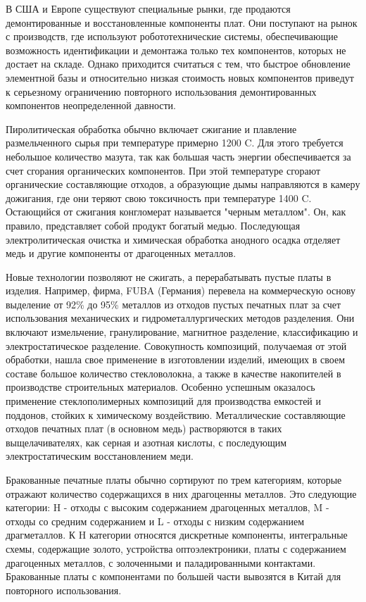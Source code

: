 В США и Европе существуют специальные рынки, где продаются демонтированные и восстановленные компоненты плат. Они поступают на рынок с производств, где используют робототехнические системы, обеспечивающие возможность идентификации и демонтажа только тех компонентов, которых не достает на складе. Однако приходится считаться с тем, что быстрое обновление элементной базы и относительно низкая стоимость новых компонентов приведут к серьезному ограничению повторного использования демонтированных компонентов неопределенной давности.

Пиролитическая обработка обычно включает сжигание и плавление размельченного сырья при температуре примерно 1200 \textdegree C. Для этого требуется небольшое количество мазута, так как большая часть энергии обеспечивается за счет сгорания органических компонентов. При этой температуре сгорают органические составляющие отходов, а образующие дымы направляются в камеру дожигания, где они теряют свою токсичность при температуре 1400 \textdegree C. Остающийся от сжигания конгломерат называется "черным металлом". Он, как правило, представляет собой продукт богатый медью. Последующая электролитическая очистка и химическая обработка анодного осадка отделяет медь и другие компоненты от драгоценных металлов.

Новые технологии позволяют не сжигать, а перерабатывать пустые платы в изделия. Например, фирма, FUBA (Германия) перевела на коммерческую основу выделение от 92\% до 95\% металлов из отходов пустых печатных плат за счет использования механических и гидрометаллургических методов разделения. Они включают измельчение, гранулирование, магнитное разделение, классификацию и электростатическое разделение. Совокупность композиций, получаемая от этой обработки, нашла свое применение в изготовлении изделий, имеющих в своем составе большое количество стекловолокна, а также в качестве накопителей в производстве строительных материалов. Особенно успешным оказалось применение стеклополимерных композиций для производства емкостей и поддонов, стойких к химическому воздействию. Металлические составляющие отходов печатных плат (в основном медь) растворяются в таких выщелачивателях, как серная и азотная кислоты, с последующим электростатическим восстановлением меди.

Бракованные печатные платы обычно сортируют по трем категориям, которые отражают количество содержащихся в них драгоценны металлов. Это следующие категории: H - отходы с высоким содержанием драгоценных металлов, M - отходы со средним содержанием и L - отходы с низким содержанием драгметаллов. К H категории относятся дискретные компоненты, интегральные схемы, содержащие золото, устройства оптоэлектроники, платы с содержанием драгоценных металлов, с золоченными и паладированными контактами. Бракованные платы с компонентами по большей части вывозятся в Китай для повторного использования.

